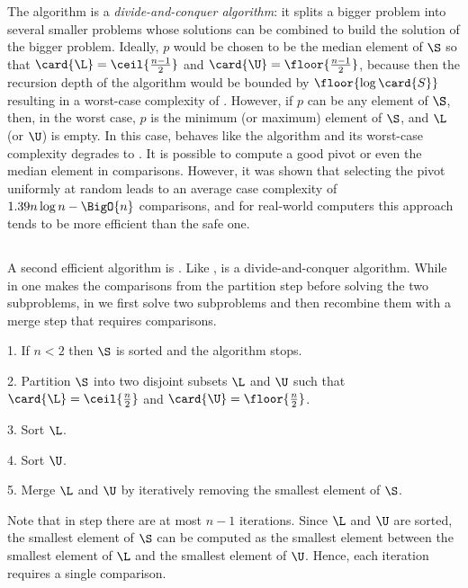 The \quicksort algorithm is a \emph{divide-and-conquer algorithm}: it splits a bigger
problem into several smaller problems whose solutions can be combined to build
the solution of the bigger problem. Ideally, \(p\) would be chosen to be the
median element of \(\S\) so that \(\card{\L} = \ceil{\frac{n-1}{2}}\) and
\(\card{\U} = \floor{\frac{n-1}{2}}\), because then the recursion depth of the
algorithm would be bounded by \(\floor{\log \card{S}}\) resulting in a
worst-case complexity of . However, if \(p\) can be any element
of \(\S\), then, in the worst case, \(p\) is the minimum (or maximum) element of
\(\S\), and \(\L\) (or \(\U\)) is empty. In this case, \quicksort behaves like
the \selectionsort algorithm and its worst-case complexity degrades to
. It is possible \cite{blum:1973} to compute a good pivot or even the
median element in  comparisons. However, it was shown \cite{hoare:1962}
that selecting the pivot uniformly at random leads to an average case
complexity of \(1.39n \log n - \BigO{n}\) comparisons, and for real-world computers this
approach tends to be more efficient than the safe one.

\subsection{\mergesort}
A second efficient algorithm is \mergesort
\cite{goldstine:1948,leiserson:2001}. Like \quicksort, \mergesort is a
divide-and-conquer algorithm. While in \quicksort one makes the comparisons from
the partition step before solving the two subproblems, in \mergesort we
first solve two subproblems and then recombine them with a merge step that
requires  comparisons.
\begin{algorithm}[\mergesort]
\item[1.] If \(n < 2\) then \(\S\) is sorted and the algorithm stops.
\item[2.] Partition \(\S\) into two disjoint subsets \(\L\) and
\(\U\) such that \(\card{\L} = \ceil{\frac{n}{2}}\) and \(\card{\U} =
\floor{\frac{n}{2}}\).
\item[3.] Sort \(\L\).
\item[4.] Sort \(\U\).
\item[5.] Merge \(\L\) and \(\U\) by iteratively removing the smallest element
of \(\S\).
\end{algorithm}

Note that in step  there are at most \(n - 1\) iterations. Since \(\L\)
and \(\U\) are sorted, the smallest element of \(\S\) can be computed as the
smallest element between the smallest element of \(\L\) and the smallest
element of \(\U\). Hence, each iteration requires a single comparison.

